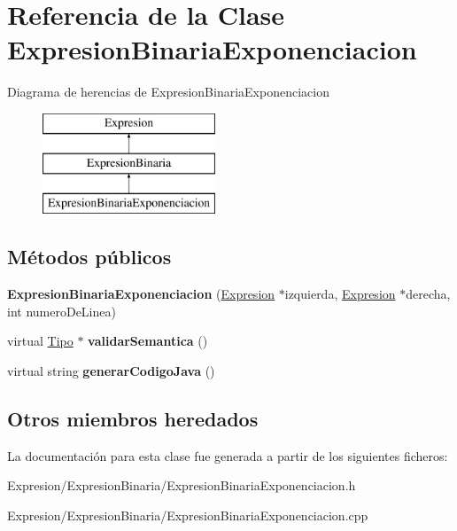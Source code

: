 \hypertarget{class_expresion_binaria_exponenciacion}{\section{Referencia de la Clase Expresion\-Binaria\-Exponenciacion}
\label{class_expresion_binaria_exponenciacion}
}
Diagrama de herencias de Expresion\-Binaria\-Exponenciacion\begin{figure}[H]
\begin{center}
\leavevmode
\includegraphics[height=3.000000cm]{class_expresion_binaria_exponenciacion}
\end{center}
\end{figure}
\subsection*{Métodos públicos}
\begin{DoxyCompactItemize}
\item 
\hypertarget{class_expresion_binaria_exponenciacion_a3af0b11cfe4d11d53bd84eb1961854d0}{{\bfseries Expresion\-Binaria\-Exponenciacion} (\hyperlink{class_expresion}{Expresion} $\ast$izquierda, \hyperlink{class_expresion}{Expresion} $\ast$derecha, int numero\-De\-Linea)}\label{class_expresion_binaria_exponenciacion_a3af0b11cfe4d11d53bd84eb1961854d0}

\item 
\hypertarget{class_expresion_binaria_exponenciacion_aad6651ca6c4b4013d8b3d2fe0be400ef}{virtual \hyperlink{class_tipo}{Tipo} $\ast$ {\bfseries validar\-Semantica} ()}\label{class_expresion_binaria_exponenciacion_aad6651ca6c4b4013d8b3d2fe0be400ef}

\item 
\hypertarget{class_expresion_binaria_exponenciacion_a34b82f5b0b312949d02c010fdd13cd5c}{virtual string {\bfseries generar\-Codigo\-Java} ()}\label{class_expresion_binaria_exponenciacion_a34b82f5b0b312949d02c010fdd13cd5c}

\end{DoxyCompactItemize}
\subsection*{Otros miembros heredados}


La documentación para esta clase fue generada a partir de los siguientes ficheros\-:\begin{DoxyCompactItemize}
\item 
Expresion/\-Expresion\-Binaria/Expresion\-Binaria\-Exponenciacion.\-h\item 
Expresion/\-Expresion\-Binaria/Expresion\-Binaria\-Exponenciacion.\-cpp\end{DoxyCompactItemize}
